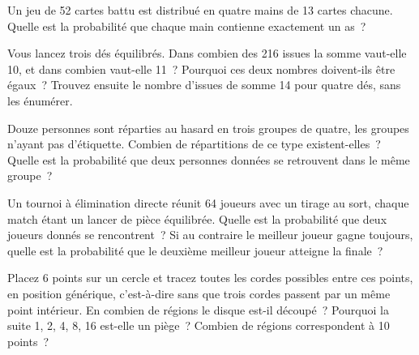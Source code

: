 \begin{question}\label{iq:iv1:counting-and-symmetry:17}
Un jeu de 52 cartes battu est distribué en quatre mains de 13 cartes chacune. Quelle est la probabilité que chaque main contienne exactement un as~?
\end{question}

\begin{question}\label{iq:iv1:counting-and-symmetry:18}
Vous lancez trois dés équilibrés. Dans combien des 216 issues la somme vaut-elle 10, et dans combien vaut-elle 11~? Pourquoi ces deux nombres doivent-ils être égaux~? Trouvez ensuite le nombre d'issues de somme 14 pour quatre dés, sans les énumérer.
\end{question}

\begin{question}\label{iq:iv1:counting-and-symmetry:19}
Douze personnes sont réparties au hasard en trois groupes de quatre, les groupes n'ayant pas d'étiquette. Combien de répartitions de ce type existent-elles~? Quelle est la probabilité que deux personnes données se retrouvent dans le même groupe~?
\end{question}

\begin{question}\label{iq:iv1:counting-and-symmetry:20}
Un tournoi à élimination directe réunit 64 joueurs avec un tirage au sort, chaque match étant un lancer de pièce équilibrée. Quelle est la probabilité que deux joueurs donnés se rencontrent~? Si au contraire le meilleur joueur gagne toujours, quelle est la probabilité que le deuxième meilleur joueur atteigne la finale~?
\end{question}

\begin{question}\label{iq:iv1:counting-and-symmetry:21}
Placez 6 points sur un cercle et tracez toutes les cordes possibles entre ces points, en position générique, c'est-à-dire sans que trois cordes passent par un même point intérieur. En combien de régions le disque est-il découpé~? Pourquoi la suite 1, 2, 4, 8, 16 est-elle un piège~? Combien de régions correspondent à 10 points~?
\end{question}

